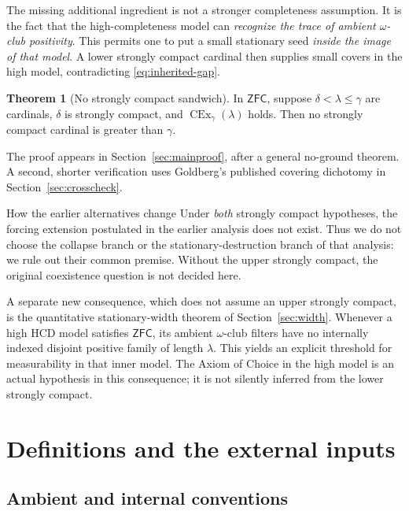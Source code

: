 \documentclass[11pt,letterpaper]{article}
\theoremstyle{definition}
\newtheorem{theorem}[definition]{Theorem}
\numberwithin{equation}{section}
\newcommand{\ZFC}{\mathsf{ZFC}}
\newcommand{\HCD}{\mathrm{HCD}}
\newcommand{\CEx}{\operatorname{CEx}}
\begin{document}
The missing additional ingredient is not a stronger completeness
assumption. It is the fact that the high-completeness model can
\emph{recognize the trace of ambient $\omega$-club positivity}. This
permits one to put a small stationary seed \emph{inside the image of
that model}. A lower strongly compact cardinal then supplies small
covers in the high model, contradicting \eqref{eq:inherited-gap}.

\begin{theorem}[No strongly compact sandwich]\label{thm:main}
In $\ZFC$, suppose $\delta<\lambda\le\gamma$ are cardinals,
$\delta$ is strongly compact, and $\CEx_\gamma(\lambda)$ holds.
Then no strongly compact cardinal is greater than $\gamma$.
\end{theorem}

The proof appears in Section~\ref{sec:mainproof}, after a general
no-ground theorem. A second, shorter verification uses Goldberg's
published covering dichotomy in Section~\ref{sec:crosscheck}.

\begin{assessment}{How the earlier alternatives change}
Under \emph{both} strongly compact hypotheses, the forcing extension
postulated in the earlier analysis does not exist. Thus we do not
choose the collapse branch or the stationary-destruction branch of that
analysis: we rule out their common premise. Without the upper strongly
compact, the original coexistence question is not decided here.
\end{assessment}

A separate new consequence, which does not assume an upper strongly
compact, is the quantitative stationary-width theorem of
Section~\ref{sec:width}. Whenever a high $\HCD$ model satisfies $\ZFC$,
its ambient $\omega$-club filters have no internally indexed disjoint
positive family of length $\lambda$. This yields an explicit threshold
for measurability in that inner model. The Axiom of Choice in the high
model is an actual hypothesis in this consequence; it is not silently
inferred from the lower strongly compact.

\section{Definitions and the external inputs}\label{sec:setup}

\subsection{Ambient and internal conventions}
\end{document}
